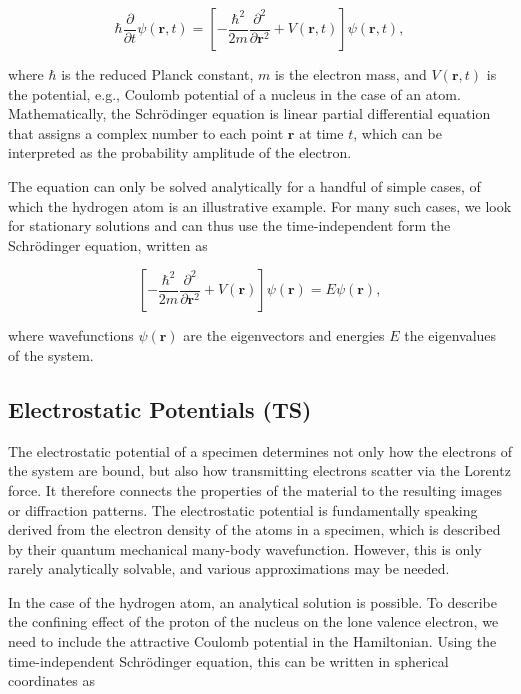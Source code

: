 \documentclass[%
 superscriptaddress,
 aip,
 amsmath,amssymb,
preprint,%
 author-year,%
longbibliography
]{revtex4-2}
\begin{document}
\begin{equation}
    \hbar \frac{\partial}{\partial t} \psi(\bm{r}, t)=\left[-\frac{\hbar^{2}}{2 m} \frac{\partial^{2}}{\partial \bm{r}^{2}}+V(\bm{r}, t)\right] \psi(\bm{r}, t),
    \label{eq:Shrodinger_time}
\end{equation}

where $\hbar$ is the reduced Planck constant, $m$ is the electron mass, and $V(\bm{r}, t)$ is the potential, e.g., Coulomb potential of a nucleus in the case of an atom. Mathematically, the Schr\"{o}dinger equation is linear partial differential equation that assigns a complex number to each point $\bm{r}$ at time $t$, which can be interpreted as the probability amplitude of the electron.

The equation can only be solved analytically for a handful of simple cases, of which the hydrogen atom is an illustrative example. For many such cases, we look for stationary solutions and can thus use the time-independent form the Schr\"{o}dinger equation, written as

\begin{equation}
    \left[-\frac{\hbar^{2}}{2 m} \frac{\partial^{2}}{\partial \bm{r}^{2}}+V(\bm{r})\right] \psi(\bm{r}) = E\psi(\bm{r}),
    \label{eq:Shrodinger}
\end{equation}

where wavefunctions $\psi(\bm{r})$ are the eigenvectors and energies $E$ the eigenvalues of the system.


\subsection*{Electrostatic Potentials (TS)}

The electrostatic potential of a specimen determines not only how the electrons of the system are bound, but also how transmitting electrons scatter via the Lorentz force. It therefore connects the properties of the material to the resulting images or diffraction patterns. The electrostatic potential is fundamentally speaking derived from the electron density of the atoms in a specimen, which is described by their quantum mechanical many-body wavefunction. However, this is only rarely analytically solvable, and various approximations may be needed.

In the case of the hydrogen atom, an analytical solution is possible. To describe the confining effect of the proton of the nucleus on the lone valence electron, we need to include the attractive Coulomb potential in the Hamiltonian. Using the time-independent Schr\"{o}dinger equation, this can be written in spherical coordinates as
\end{document}
